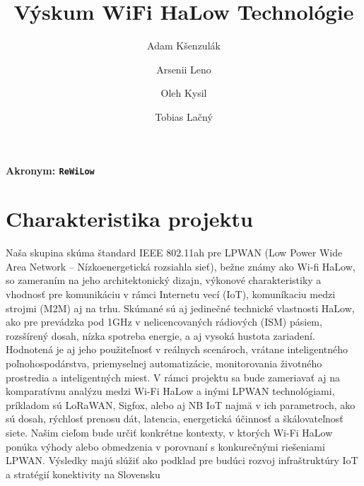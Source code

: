 \documentclass[11pt]{article}
\title{ \bf Výskum WiFi HaLow Technológie}
\author{Adam Kšenzulák\and Arsenii Leno\and Oleh Kysil\and Tobias Lačný}
\date{}
\begin{document}
\maketitle
\paragraph {\bf Akronym: \tt ReWiLow}
\section*{\bf Charakteristika projektu}


Naša skupina skúma štandard IEEE 802.11ah pre LPWAN (Low Power Wide Area Network – Nízkoenergetická rozsiahla sieť), bežne známy ako Wi-fi HaLow, so zameraním  na jeho architektonický dizajn, výkonové charakteristiky a vhodnosť pre komunikáciu v rámci Internetu vecí (IoT), komuníkaciu medzi strojmi (M2M) aj na trhu. Skúmané sú aj jedinečné technické vlastnosti HaLow, ako pre prevádzka pod 1GHz v nelicencovaných rádiových (ISM) pásiem, rozsšírený dosah, nízka spotreba energie, a aj vysoká hustota zariadení. Hodnotená je aj jeho použiteľnosť v reálnych scenároch, vrátane inteligentného poľnohospodárstva, priemyselnej automatizácie, monitorovania životného prostredia a inteligentných miest.
V rámci projektu sa bude zameriavať aj na komparatívnu analýzu medzi Wi-Fi HaLow a inými LPWAN technológiami, príkladom sú LoRaWAN, Sigfox, alebo aj NB IoT najmä v ich parametroch, ako sú dosah, rýchlosť prenosu dát, latencia, energetická účinnosť a škálovateľnosť siete. Našim cieľom bude určiť konkrétne kontexty, v ktorých Wi-Fi HaLow ponúka výhody alebo obmedzenia v porovnaní s konkurečnými riešeniami LPWAN. Výsledky majú slúžiť ako podklad pre budúci rozvoj infraštruktúry IoT a stratégií konektivity na Slovensku
\end{document}
